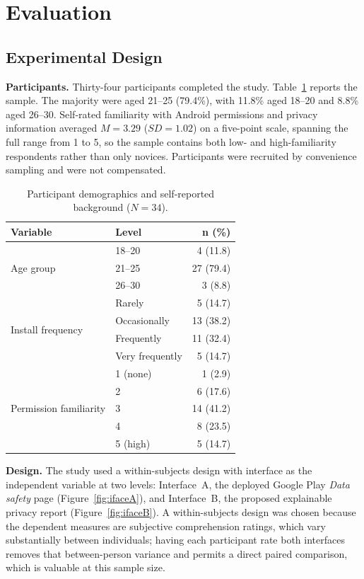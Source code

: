 \documentclass[sigconf]{acmart}
\begin{document}
\section{Evaluation}

\subsection{Experimental Design}

\textbf{Participants.} Thirty-four participants completed the study.
Table~\ref{tab:demo} reports the sample. The majority were aged 21--25
(79.4\%), with 11.8\% aged 18--20 and 8.8\% aged 26--30. Self-rated
familiarity with Android permissions and privacy information averaged
$M=3.29$ ($SD=1.02$) on a five-point scale, spanning the full range from 1
to 5, so the sample contains both low- and high-familiarity respondents
rather than only novices. Participants were recruited by convenience
sampling and were not compensated.

\begin{table}[t]
\caption{Participant demographics and self-reported background ($N=34$).}
\label{tab:demo}
\small
\begin{tabular}{@{}llr@{}}
\toprule
\textbf{Variable} & \textbf{Level} & \textbf{n (\%)} \\
\midrule
\multirow{3}{*}{Age group}
 & 18--20 & 4 (11.8) \\
 & 21--25 & 27 (79.4) \\
 & 26--30 & 3 (8.8) \\
\midrule
\multirow{4}{*}{Install frequency}
 & Rarely & 5 (14.7) \\
 & Occasionally & 13 (38.2) \\
 & Frequently & 11 (32.4) \\
 & Very frequently & 5 (14.7) \\
\midrule
\multirow{5}{*}{Permission familiarity}
 & 1 (none) & 1 (2.9) \\
 & 2 & 6 (17.6) \\
 & 3 & 14 (41.2) \\
 & 4 & 8 (23.5) \\
 & 5 (high) & 5 (14.7) \\
\bottomrule
\end{tabular}
\end{table}

\textbf{Design.} The study used a within-subjects design with interface as
the independent variable at two levels: Interface~A, the deployed Google
Play \emph{Data safety} page (Figure~\ref{fig:ifaceA}), and Interface~B,
the proposed explainable privacy report (Figure~\ref{fig:ifaceB}). A
within-subjects design was chosen because the dependent measures are
subjective comprehension ratings, which vary substantially between
individuals; having each participant rate both interfaces removes that
between-person variance and permits a direct paired comparison, which is
valuable at this sample size.
\end{document}
